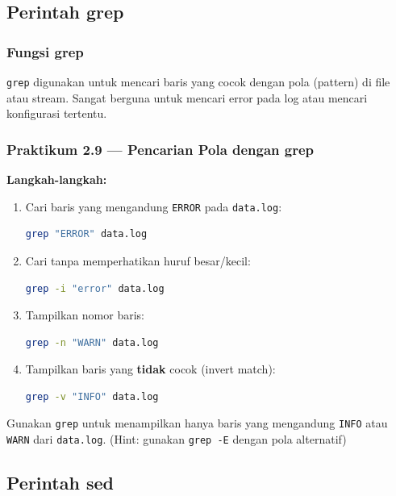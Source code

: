 \subsection{Perintah grep}
\subsubsection*{Fungsi grep}
\texttt{grep} digunakan untuk mencari baris yang cocok dengan pola (pattern) di file atau stream.
Sangat berguna untuk mencari error pada log atau mencari konfigurasi tertentu.

\subsubsection*{Praktikum 2.9 --- Pencarian Pola dengan grep}
\textbf{Langkah-langkah:}
\begin{enumerate}
    \item Cari baris yang mengandung \texttt{ERROR} pada \texttt{data.log}:
\begin{lstlisting}[language=bash, caption={grep sederhana}]
grep "ERROR" data.log
\end{lstlisting}

    \item Cari tanpa memperhatikan huruf besar/kecil:
\begin{lstlisting}[language=bash, caption={grep case-insensitive}]
grep -i "error" data.log
\end{lstlisting}

    \item Tampilkan nomor baris:
\begin{lstlisting}[language=bash, caption={grep dengan nomor baris}]
grep -n "WARN" data.log
\end{lstlisting}

    \item Tampilkan baris yang \textbf{tidak} cocok (invert match):
\begin{lstlisting}[language=bash, caption={grep invert match}]
grep -v "INFO" data.log
\end{lstlisting}
\end{enumerate}

\begin{exercisebox}[2.4]
Gunakan \texttt{grep} untuk menampilkan hanya baris yang mengandung \texttt{INFO} atau \texttt{WARN} dari \texttt{data.log}.
(Hint: gunakan \texttt{grep -E} dengan pola alternatif)
\end{exercisebox}

\subsection{Perintah sed}

